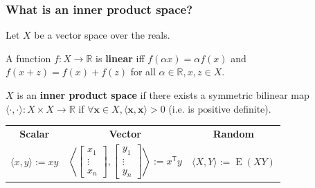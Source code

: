 \documentclass{beamer}
\begin{document}
    \begin{frame}
        \frametitle{What is an inner product space?}
        Let $X$ be a vector space over the reals.
        \begin{definition}
            A function $f: X \rightarrow \mathbb R$ is \textbf{linear} iff $f(\alpha x)= \alpha f(x)$
            and $f(x+z)=f(x)+f(z)$ for all $\alpha\in\mathbb R, x,z \in X$.
        \end{definition}

        \begin{definition}
            $X$ is an \textbf{inner product space} if there exists a symmetric bilinear map $\langle \cdot ,\cdot \rangle :X\times X\to \mathbb R$ if $\forall \mathbf x \in X, \langle \mathbf x,\mathbf x \rangle > 0$ (i.e. is positive definite).
        \end{definition}
        \begin{center}
            \begin{tabular}{ c c c }
                \textbf{Scalar} & \textbf{Vector} & \textbf{Random} \\
                $\langle x,y\rangle := xy$ &
                $\left\langle {\begin{bmatrix}x_{1}\\\vdots \\x_{n}\end{bmatrix}},{\begin{bmatrix}y_{1}\\\vdots \\y_{n}\end{bmatrix}}\right\rangle :=x^{\textsf {T}}y$ &
                $\langle X,Y\rangle :=\operatorname {E} (XY)$
            \end{tabular}
        \end{center}
    \end{frame}
\end{document}
